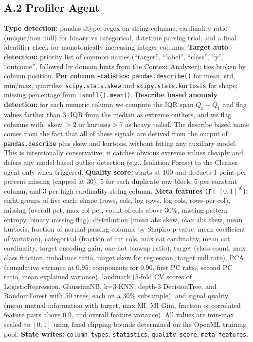 \documentclass{article}
\begin{document}
\subsection*{A.2 Profiler Agent}
\textbf{Type detection:} pandas dtype, regex on string columns, cardinality
ratio (unique/non null) for binary vs categorical, datetime parsing trial,
and a final identifier check for monotonically increasing integer columns.
\textbf{Target auto detection:} priority list of common names (``target'',
``label'', ``class'', ``y'', ``outcome'', followed by domain hints from the
Context Analyzer); ties broken by column position.
\textbf{Per column statistics:} \texttt{pandas.describe()} for mean, std,
min/max, quartiles; \texttt{scipy.stats.skew} and \texttt{scipy.stats.kurtosis}
for shape; missing percentage from \texttt{isnull().mean()}.
\textbf{Describe based anomaly detection:} for each numeric column we
compute the IQR span $Q_3 - Q_1$ and flag values farther than
$3 \cdot \mathrm{IQR}$ from the median as extreme outliers, and we flag
columns with $|\text{skew}| > 2$ or $\text{kurtosis} > 7$ as heavy tailed.
The describe based name comes from the fact that all of these signals are
derived from the output of \texttt{pandas.describe} plus skew and kurtosis,
without fitting any auxiliary model. This is intentionally conservative; it
catches obvious extreme values cheaply and defers any model based outlier
detection (e.g., Isolation Forest) to the Cleaner agent only when triggered.
\textbf{Quality score:} starts at 100 and deducts 1 point per percent missing
(capped at 30), 5 for each duplicate row block, 5 per constant column, and 3
per high cardinality string column.
\textbf{Meta features ($\mathbf{f}\in[0,1]^{40}$):} eight groups of five
each: shape (rows, cols, log rows, log cols, rows-per-col), missing
(overall pct, max col pct, count of cols above 30\%, missing pattern entropy,
binary missing flag), distribution (mean abs skew, max abs skew, mean
kurtosis, fraction of normal-passing columns by Shapiro p-value, mean
coefficient of variation), categorical (fraction of cat cols, max cat
cardinality, mean cat cardinality, target encoding gain, one-hot blowup
ratio), target (class count, max class fraction, imbalance ratio,
target skew for regression, target null rate), PCA (cumulative variance
at 0.95, components for 0.90, first PC ratio, second PC ratio, mean
explained variance), landmark (5-fold CV scores of LogisticRegression,
GaussianNB, k=3 KNN, depth-3 DecisionTree, and RandomForest with 50 trees,
each on a 30\% subsample), and signal quality (mean mutual information
with target, max MI, MI Gini, fraction of correlated feature pairs above
0.9, and overall feature variance). All values are min-max scaled to $[0,1]$
using fixed clipping bounds determined on the OpenML training pool.
\textbf{State writes:} \texttt{column\_types}, \texttt{statistics},
\texttt{quality\_score}, \texttt{meta\_features}.
\end{document}
